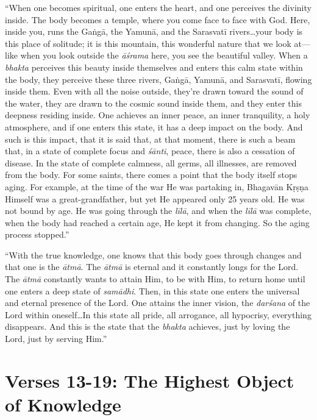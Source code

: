 \enquote{When one becomes spiritual, one enters the heart, and one perceives the divinity inside. The body becomes a temple, where you come face to face with God. Here, inside you, runs the Gaṅgā, the Yamunā, and the Sarasvatī rivers\ldots your body is this place of solitude; it is this mountain, this wonderful nature that we look at---like when you look outside the \textit{āśrama} here, you see the beautiful valley. When a \textit{bhakta} perceives this beauty inside themselves and enters this calm state within the body, they perceive these three rivers, Gaṅgā, Yamunā, and Sarasvatī, flowing inside them. Even with all the noise outside, they’re drawn toward the sound of the water, they are drawn to the cosmic sound inside them, and they enter this deepness residing inside. One achieves an inner peace, an inner tranquility, a holy atmosphere, and if one enters this state, it has a deep impact on the body. And such is this impact, that it is said that, at that moment, there is such a beam that, in a state of complete focus and \textit{śānti}, peace, there is also a cessation of disease. In the state of complete calmness, all germs, all illnesses, are removed from the body. For some saints, there comes a point that the body itself stops aging. For example, at the time of the war He was partaking in, Bhagavān Kṛṣṇa Himself was a great-grandfather, but yet He appeared only 25 years old. He was not bound by age. He was going through the \textit{līlā}, and when the \textit{līlā} was complete, when the body had reached a certain age, He kept it from changing. So the aging process stopped.}

\enquote{With the true knowledge, one knows that this body goes through changes and that one is the \textit{ātmā}. The \textit{ātmā} is eternal and it constantly longs for the Lord. The \textit{ātmā} constantly wants to attain Him, to be with Him, to return home until one enters a deep state of \textit{samādhi}. Then, in this state one enters the universal and eternal presence of the Lord. One attains the inner vision, the \textit{darśana} of the Lord within oneself\ldots In this state all pride, all arrogance, all hypocrisy, everything disappears. And this is the state that the \textit{bhakta} achieves, just by loving the Lord, just by serving Him.}

\section{Verses 13-19: The Highest Object of Knowledge}\label{sec-verses-13-19-the-highest-object-of-knowledge}


